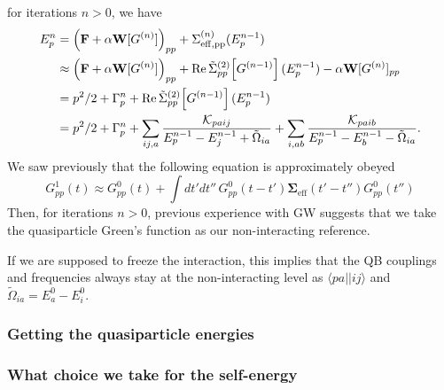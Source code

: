 for iterations $n>0$, we have
\begin{align}
    E^n_p
&= \left(\mathbf{F} + \alpha \mathbf{W}[G^{(n)}] \right)_{pp} + \Sigma_{\rm eff,pp}^{(n)}(E^{n-1}_p)\\
&\approx \left(\mathbf{F} + \alpha \mathbf{W}[G^{(n)}] \right)_{pp} + \operatorname{Re}\tilde{\Sigma}_{pp}^{(2)}\!\left[ G^{(n-1)} \right](E^{n-1}_p) - \alpha \mathbf{W}[G^{(n)}]_{pp} \\
    &= p^2/2 + \Gamma_p^{n} + \operatorname{Re}\tilde{\Sigma}_{pp}^{(2)}\!\left[ G^{(n-1)} \right](E^{n-1}_p)\\
&= p^2/2 + \Gamma_p^{n} + \sum_{ij,a} \frac{\mathcal{K}_{paij}}{E^{n-1}_p - E^{n-1}_j + \tilde{\Omega}_{ia}} + \sum_{i,ab} \frac{\mathcal{K}_{paib}}{E^{n-1}_p - E^{n-1}_b - \tilde{\Omega}_{ia}}.
\end{align}
We saw previously that the following equation is approximately obeyed
\begin{equation}
    G_{pp}^1(t) \approx
   G_{pp}^{0}(t)
 + \int dt' dt'' \,
   G_{pp}^{0}(t - t')
   \bm{\Sigma}_{\mathrm{eff}}(t' - t'')
   G_{pp}^{0}(t'')
\end{equation}
  Then, for iterations $n>0$, previous experience with GW suggests that we take the quasiparticle Green's function as our non-interacting reference. 
\begin{tcolorbox}[colback=red!5!white, colframe=red!75!black, title=How we should choose $W^{(n)}$ ]
If we are supposed to freeze the interaction, this implies that the QB couplings and frequencies always stay at the non-interacting level as $\langle p a||ij\rangle$ and $\tilde{\Omega}_{ia}=E^0_a - E^0_i$.
\end{tcolorbox}
\subsubsection{Getting the quasiparticle energies}
\subsubsection{What choice we take for the self-energy}

